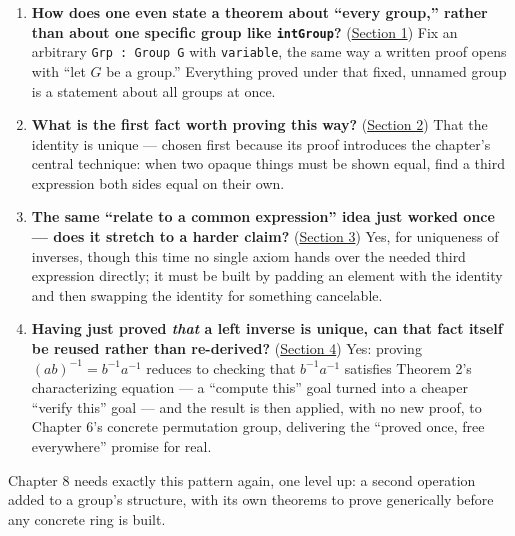 \begin{enumerate}
\def\labelenumi{\arabic{enumi}.}
\tightlist
\item
  \textbf{How does one even state a theorem about ``every group,'' rather than about one specific group like \texttt{intGroup}?} (\hyperref[sec:07-group-theorems:01-setup:1]{Section 1}) Fix an arbitrary \texttt{Grp : Group G} with \texttt{variable}, the same way a written proof opens with ``let \(G\) be a group.'' Everything proved under that fixed, unnamed group is a statement about all groups at once.
\item
  \textbf{What is the first fact worth proving this way?} (\hyperref[sec:07-group-theorems:02-theorem-1:1]{Section 2}) That the identity is unique --- chosen first because its proof introduces the chapter's central technique: when two opaque things must be shown equal, find a third expression both sides equal on their own.
\item
  \textbf{The same ``relate to a common expression'' idea just worked once --- does it stretch to a harder claim?} (\hyperref[sec:07-group-theorems:03-theorem-2:1]{Section 3}) Yes, for uniqueness of inverses, though this time no single axiom hands over the needed third expression directly; it must be built by padding an element with the identity and then swapping the identity for something cancelable.
\item
  \textbf{Having just proved \emph{that} a left inverse is unique, can that fact itself be reused rather than re-derived?} (\hyperref[sec:07-group-theorems:04-theorem-3:1]{Section 4}) Yes: proving \((ab)^{-1} = b^{-1}a^{-1}\) reduces to checking that \(b^{-1}a^{-1}\) satisfies Theorem 2's characterizing equation --- a ``compute this'' goal turned into a cheaper ``verify this'' goal --- and the result is then applied, with no new proof, to Chapter 6's concrete permutation group, delivering the ``proved once, free everywhere'' promise for real.
\end{enumerate}

Chapter 8 needs exactly this pattern again, one level up: a second operation added to a group's structure, with its own theorems to prove generically before any concrete ring is built.







